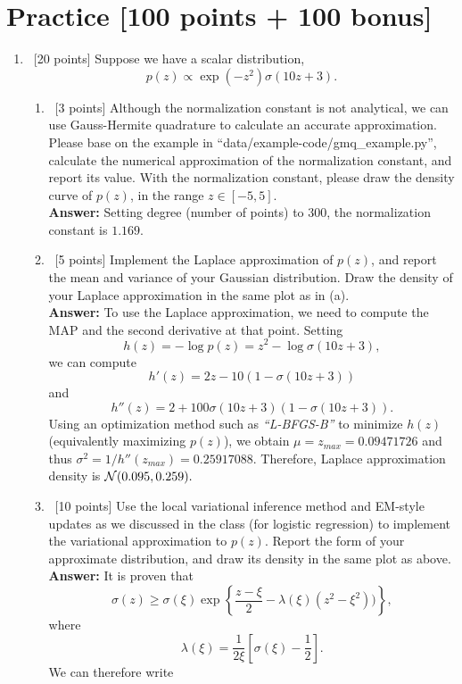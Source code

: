 \documentclass[12pt, fullpage,letterpaper]{article}
\def\red{\color{black!30!red}}
\def\blackblue{\color{black!40!blue}}
\begin{document}
\section*{Practice  [100 points + 100 bonus]}	
\label{sec:q1}
\begin{enumerate}
	\item~[20 points] Suppose we have a scalar distribution, 
	\[
	p(z) \propto \exp(-z^2)\sigma(10z + 3).
	\]
	\begin{enumerate}
		\item~[3 points] Although the normalization constant is not analytical, we can use Gauss-Hermite quadrature to calculate an accurate approximation. Please base on the example in ``data/example-code/gmq\_example.py'', calculate the numerical approximation of the normalization constant, and report its value. With the normalization constant, please draw the density curve of $p(z)$, in the range $z \in [-5, 5]$. \\
{\bf \red Answer: }{\blackblue 
Setting degree (number of points) to $300$, the normalization constant is $1.169$.
}
		\item~[5 points] Implement the Laplace approximation of $p(z)$, and report the mean and variance of your Gaussian distribution. Draw the density of your Laplace approximation in the same plot as in (a).  \\
{\bf \red Answer: }{\blackblue 
To use the Laplace approximation, we need to compute the MAP and the second derivative at that point. 
Setting 
$$
h(z) = -\log p(z) =  z^2 - \log \sigma(10z + 3), 
$$
we can compute 
$$
h'(z) = 2z - 10(1-\sigma(10z + 3)) 
$$
and 
$$
h''(z) = 2 + 100\sigma(10z+3)(1-\sigma(10z + 3)).
$$
Using an optimization method such as {\it ``L-BFGS-B''} to minimize $h(z)$ (equivalently maximizing $p(z)$),
we obtain $\mu = z_{max} = 0.09471726$ and thus 
$\sigma^2 = 1/h''(z_{max}) = 0.25917088.$
Therefore, Laplace approximation density is $\mathcal{N}(0.095, 0.259).$
}
		\item~[10 points] Use the local variational inference method and EM-style updates as we discussed in the class (for logistic regression) to implement the variational approximation to $p(z)$. Report the form of your approximate distribution, and draw its density in the same plot as above.\\
{\bf \red Answer: }{\blackblue 
It is proven that 
$$\sigma(z)\geq \sigma(\xi)\exp\left\{\frac{z-\xi}{2}-\lambda(\xi)(z^2-\xi^2))\right\},$$
where 
$$\lambda(\xi)=\frac{1}{2\xi}\left[\sigma(\xi)-\frac{1}{2}\right].$$
We can therefore write 
\begin{align*}

\end{align*}}
\end{enumerate}
\end{enumerate}
\end{document}
